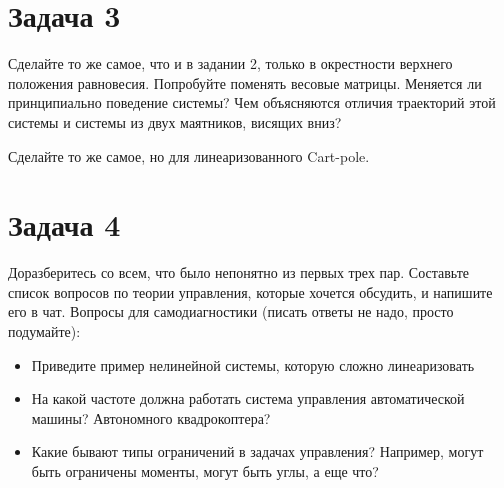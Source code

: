 \documentclass{article}
\begin{document}
\section*{Задача 3}

Сделайте то же самое, что и в задании 2, только в окрестности верхнего положения равновесия. Попробуйте поменять весовые матрицы. Меняется ли принципиально поведение системы? Чем объясняются отличия траекторий этой системы и системы из двух маятников, висящих вниз?

Сделайте то же самое, но для линеаризованного Cart-pole.

\section*{Задача 4}

Доразберитесь со всем, что было непонятно из первых трех пар. Составьте список вопросов по теории управления, которые хочется обсудить, и напишите его в чат. Вопросы для самодиагностики (писать ответы не надо, просто подумайте):
\begin{itemize}
    \item Приведите пример нелинейной системы, которую сложно линеаризовать
    \item На какой частоте должна работать система управления автоматической машины? Автономного квадрокоптера?
    \item Какие бывают типы ограничений в задачах управления? Например, могут быть ограничены моменты, могут быть углы, а еще что?
\end{itemize}
\end{document}
